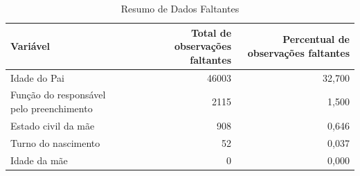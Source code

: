 \begin{table}

\caption{Resumo de Dados Faltantes}
\centering
\begin{tabular}[t]{l|r|r}
\hline
Variável & Total de observações faltantes & Percentual de observações faltantes\\
\hline
Idade do Pai & 46003 & 32,700\\
Função do responsável pelo preenchimento & 2115 & 1,500\\
Estado civil da mãe & 908 & 0,646\\
Turno do nascimento & 52 & 0,037\\
Idade da mãe & 0 & 0,000\\
\hline
\end{tabular}
\end{table}
